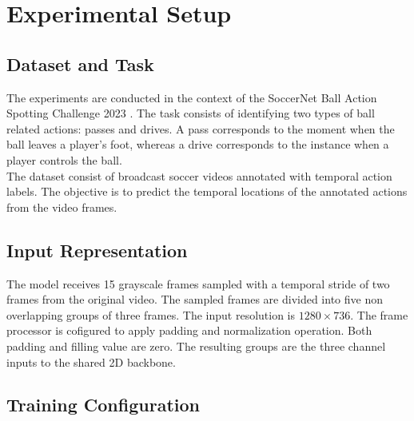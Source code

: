 \documentclass[conference]{IEEEtran}
\begin{document}
\section{Experimental Setup}

\subsection{Dataset and Task}

The experiments are conducted in the context of the SoccerNet Ball Action Spotting Challenge 2023 \cite{Cioppa_2024}. The task consists of identifying two types of ball related actions: passes and drives. A pass corresponds to the moment when the ball leaves a player's foot, whereas a drive corresponds to the instance when a player controls the ball.\\
The dataset consist of broadcast soccer videos annotated with temporal action labels. The objective is to predict the temporal locations of the annotated actions from the video frames.

\subsection{Input Representation}

The model receives 15 grayscale frames sampled with a temporal stride of two frames from the original video. The sampled frames are divided into five non overlapping groups of three frames. The input resolution is $1280\times736$. The frame processor is cofigured to apply padding and normalization operation. Both padding and filling value are zero. The resulting groups are the three channel inputs to the shared 2D backbone.


\subsection{Training Configuration}
\end{document}
